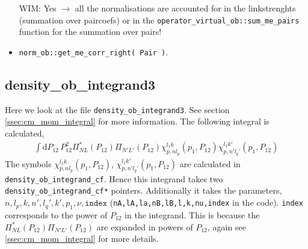 \documentclass[10pt]{article}
\begin{document}
\begin{itemize}
{	WIM: Yes $\rightarrow$ all the normalisations are accounted for in the 
linkstrenghts (summation over paircoefs) or in the 
\texttt{operator\_virtual\_ob::sum\_me\_pairs} function for the summation over 
pairs!
		}
	\item \texttt{norm\_ob::get\_me\_corr\_right( Pair )}.
\end{itemize}

\subsection{ density\_ob\_integrand3 }
Here we look at the file \texttt{density\_ob\_integrand3}. See section \ref{ssec:cm_mom_integral} for more information. The following integral is calculated,
\begin{align*}
\int \text{d} P_{12} \, P_{12}^{2} \Pi^{*}_{N L}(P_{12}) \Pi_{N' L'}(P_{12}) \chi_{p,nl_p}^{l_1 k}(p_1,P_{12}) \chi_{p,n'l_q'}^{l_1 k'}(p_1,P_{12}) 
\end{align*}
The symbols $\chi_{p,nl_p}^{l_1 k}(p_1,P_{12})$, $\chi_{p,n'l_q'}^{l_1 
k'}(p_1,P_{12})$ are calculated in \texttt{density\_ob\_integrand\_cf}. Hence 
this integrand takes two \texttt{density\_ob\_integrand\_cf*} pointers. 
Additionally it takes the parameters, 
$n,l_p,k,n',l_q',k',p_1,\nu,\texttt{index}$ 
(\texttt{nA,lA,la,nB,lB,l,k,nu,index} in the code). \texttt{index} corresponds 
to the power of $P_{12}$ in the integrand. This is because the $\Pi^{*}_{N 
L}(P_{12}) \Pi_{N' L'}(P_{12})$ are expanded in powers of $P_{12}$, again see 
\ref{ssec:cm_mom_integral} for more details.
\end{document}
